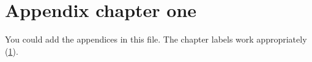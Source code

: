 \begin{appendices}
\label{appendix}
\chapter{Appendix chapter one}
\label{chap_app_1}

You could add the appendices in this file. The chapter labels work appropriately
(\ref{chap_app_1}).

\end{appendices}
